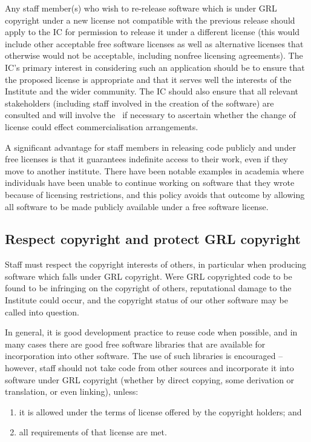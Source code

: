 \documentclass[10pt,a4paper]{article}
\begin{document}
\par Any staff member(s) who wish to re-release software which is under GRL 
copyright under a new license not compatible with the previous release should 
apply to the IC for permission to release it under a different license (this would 
include other acceptable free software licenses as well as alternative licenses 
that otherwise would not be acceptable, including nonfree licensing 
agreements). The IC's primary interest in considering such an application 
should be to ensure that the proposed license is appropriate and that it serves 
well the interests of the Institute and the wider community. The IC should also 
ensure that all relevant stakeholders (including staff involved in the creation of 
the software) are consulted and will involve the \exectitle\ if necessary to 
ascertain whether the change of license could effect commercialisation 
arrangements. 

\par A significant advantage for staff members in releasing code publicly and 
under free licenses is that it guarantees indefinite access to their work, even 
if they move to another institute. There have been notable examples in 
academia where individuals have been unable to continue working on software 
that they wrote because of licensing restrictions, and this policy avoids that 
outcome by allowing all software to be made publicly available under a free 
software license. 


\subsection{Respect copyright and protect GRL copyright}
\label{section:policy.protection}

\par Staff must respect the copyright interests of others, in particular when producing 
software which falls under GRL copyright. Were GRL copyrighted code to be found 
to be infringing on the copyright of others, reputational damage to the Institute could 
occur, and the copyright status of our other software may be called into question. 

\par In general, it is good development practice to reuse code when possible, and in 
many cases there are good free software libraries that are available for 
incorporation into other software. The use of such libraries is encouraged -- however, 
staff should not take code from other sources and incorporate it into software under 
GRL copyright (whether by direct copying, some derivation or translation, or even 
linking), unless:
\begin{enumerate}
\item it is allowed under the terms of license offered by the copyright holders; and
\item all requirements of that license are met. 
\end{enumerate} 
\end{document}
